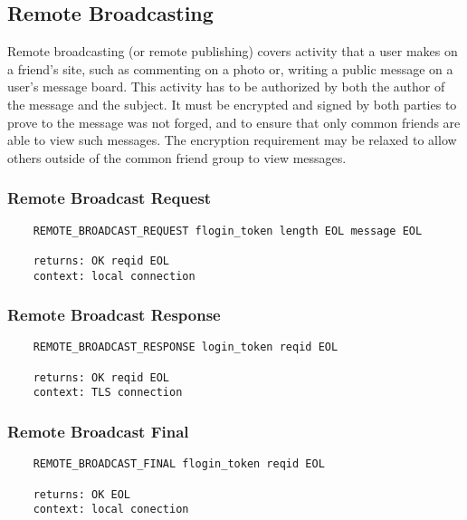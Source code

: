 \documentclass[letterpaper,11pt,oneside]{article}
\begin{document}
\subsection{Remote Broadcasting}

Remote broadcasting (or remote publishing) covers activity that a user makes on
a friend's site, such as commenting on a photo or, writing a public message on
a user's message board. This activity has to be authorized by both the author
of the message and the subject. It must be encrypted and signed by both parties
to prove to the message was not forged, and to ensure that only common friends
are able to view such messages. The encryption requirement may be relaxed to
allow others outside of the common friend group to view messages.

\subsubsection{Remote Broadcast Request}

\vspace{10pt}
\begin{verbatim}
    REMOTE_BROADCAST_REQUEST flogin_token length EOL message EOL

    returns: OK reqid EOL
    context: local connection
\end{verbatim}
\vspace{10pt}

\subsubsection{Remote Broadcast Response}

\vspace{10pt}
\begin{verbatim}
    REMOTE_BROADCAST_RESPONSE login_token reqid EOL 

    returns: OK reqid EOL
    context: TLS connection
\end{verbatim}
\vspace{10pt}

\subsubsection{Remote Broadcast Final}

\vspace{10pt}
\begin{verbatim}
    REMOTE_BROADCAST_FINAL flogin_token reqid EOL 

    returns: OK EOL
    context: local conection
\end{verbatim}
\vspace{10pt}
\end{document}
